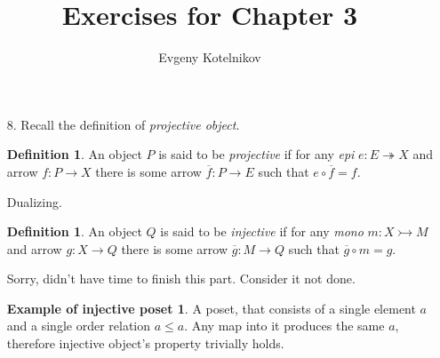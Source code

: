 \documentclass[12pt]{article}
\author{Evgeny Kotelnikov}
\title{Exercises for Chapter 3}
\date{}
\theoremstyle{definition}
\begin{document}
\maketitle

\begin{enumerate}
  \item[8.]
    Recall the definition of \emph{projective object}.
    \newtheorem*{projective}{Definition}
    \begin{projective}
      An object $P$ is said to be \emph{projective} if for any \emph{epi} $e : E \twoheadrightarrow X$ and arrow $f : P \to X$ there is some arrow $\overline{f} : P \to E$ such that $e \circ \overline{f} = f$.
      \begin{figure}[H]
        \centering
      \end{figure}
    \end{projective}
    
    Dualizing.
    
    \newtheorem*{injective}{Definition}
    \begin{injective}
      An object $Q$ is said to be \emph{injective} if for any \emph{mono} $m : X \rightarrowtail M$ and arrow $g : X \to Q$ there is some arrow $\overline{g} : M \to Q$ such that $\overline{g} \circ m = g$.
      \begin{figure}[H]
        \centering
      \end{figure}
    \end{injective}

    Sorry, didn't have time to finish this part. Consider it not done.

    \newtheorem*{injective-poset}{Example of injective poset}
    \begin{injective-poset}
      A poset, that consists of a single element $a$ and a single order relation $a \leq a $. Any map into it produces the same $a$, therefore injective object's property trivially holds. 
    \end{injective-poset}


\end{enumerate}
\end{document}

